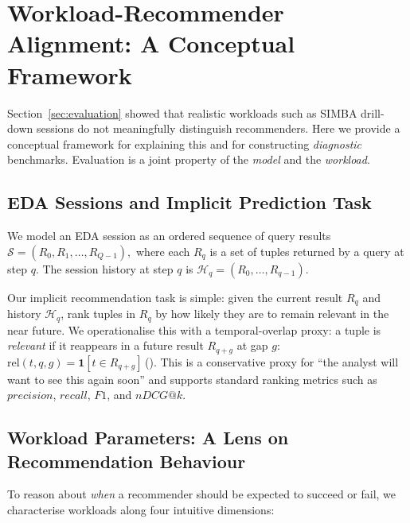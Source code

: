 \section{Workload-Recommender Alignment: A Conceptual Framework}
\label{sec:theory}

Section~\ref{sec:evaluation} showed that realistic workloads such as SIMBA drill-down sessions do not meaningfully distinguish recommenders. Here we provide a conceptual framework for explaining this and for constructing \emph{diagnostic} benchmarks. Evaluation is a joint property of the \emph{model} and the \emph{workload}.

\vspace{-0.5em}
\subsection{EDA Sessions and Implicit Prediction Task}
\label{sec:theory:model}

We model an EDA session as an ordered sequence of query results
\(
  \mathcal{S} = (R_0, R_1, \ldots, R_{Q-1}),
\)
where each $R_q$ is a set of tuples returned by a query at step $q$. The session history at step $q$ is
\(
  \mathcal{H}_q = (R_0, \ldots, R_{q-1}).
\)

Our implicit recommendation task is simple: given the current result $R_q$ and history $\mathcal{H}_q$, rank tuples in $R_q$ by how likely they are to remain relevant in the near future. We operationalise this with a temporal-overlap proxy: a tuple is \emph{relevant} if it reappears in a future result $R_{q+g}$ at gap $g$:
\begingroup{}\label{eq:relevance}\(\text{rel}(t, q, g) = \mathbf{1}[t \in R_{q+g}]\)\,\textup{(\theequation)}\endgroup. This is a conservative proxy for ``the analyst will want to see this again soon'' and supports standard ranking metrics such as $precision$, $recall$, $F1$, and $nDCG@k$.

\vspace{-0.5em}
\subsection{Workload Parameters: A Lens on Recommendation Behaviour}
\label{sec:theory:params}

To reason about \emph{when} a recommender should be expected to succeed or fail, we characterise workloads along four intuitive dimensions:

